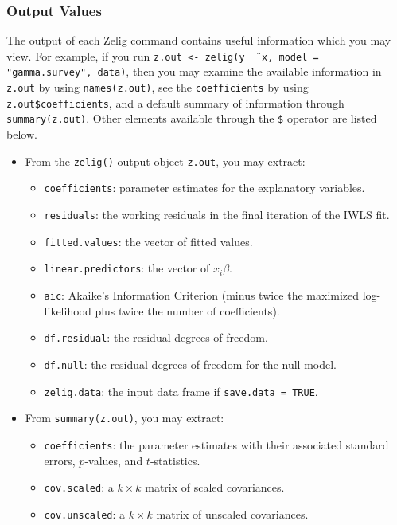 \subsubsection{Output Values}

The output of each Zelig command contains useful information which you
may view.  For example, if you run \texttt{z.out <- zelig(y \~\,
  x, model = "gamma.survey", data)}, then you may examine the available
information in \texttt{z.out} by using \texttt{names(z.out)},
see the {\tt coefficients} by using {\tt z.out\$coefficients}, and
a default summary of information through \texttt{summary(z.out)}.
Other elements available through the {\tt \$} operator are listed
below.

\begin{itemize}
\item From the {\tt zelig()} output object {\tt z.out}, you may
  extract:
   \begin{itemize}
   \item {\tt coefficients}: parameter estimates for the explanatory
     variables.
   \item {\tt residuals}: the working residuals in the final iteration
     of the IWLS fit.
   \item {\tt fitted.values}: the vector of fitted values.
   \item {\tt linear.predictors}: the vector of $x_{i}\beta$.
   \item {\tt aic}: Akaike's Information Criterion (minus twice the
     maximized log-likelihood plus twice the number of coefficients).
   \item {\tt df.residual}: the residual degrees of freedom.
   \item {\tt df.null}: the residual degrees of freedom for the null
     model.
   \item {\tt zelig.data}: the input data frame if {\tt save.data = TRUE}.  
   \end{itemize}

\item From {\tt summary(z.out)}, you may extract: 
   \begin{itemize}
   \item {\tt coefficients}: the parameter estimates with their
     associated standard errors, $p$-values, and $t$-statistics.
   \item{\tt cov.scaled}: a $k \times k$ matrix of scaled covariances.
   \item{\tt cov.unscaled}: a $k \times k$ matrix of unscaled
     covariances.  
   \end{itemize}


\end{itemize}
